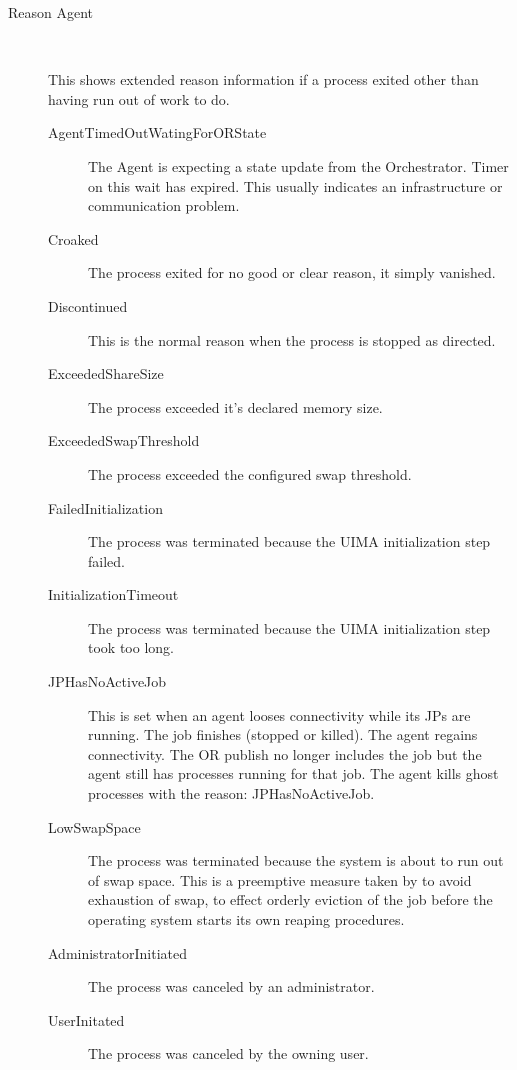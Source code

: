 \begin{description}
          \item[Reason Agent] \hfill \\
          \label{itm:job-details-agent}

          This shows extended reason information if a process exited other than having run out
          of work to do.

            \begin{description}
              \item[AgentTimedOutWatingForORState] The {\DUCC} Agent is expecting a state update
                from the {\DUCC} Orchestrator.  Timer on this wait has expired.  This usually 
                indicates an infrastructure or communication problem.
              \item[Croaked] The process exited for no good or clear reason, it simply vanished.
              \item[Discontinued] This is the normal reason when the process is stopped as directed.
              \item[ExceededShareSize] The process exceeded it's declared memory size.
              \item[ExceededSwapThreshold] The process exceeded the configured swap threshold.
              \item[FailedInitialization] The process was terminated because the UIMA 
                initialization step failed.
              \item[InitializationTimeout] The process was terminated because the UIMA initialization
                step took too long.
              \item[JPHasNoActiveJob] This is set when an agent looses connectivity while its
                JPs are running. The job finishes (stopped or killed). The agent regains
                connectivity. The OR publish no longer includes the job but the agent still has
                processes running for that job. The agent kills ghost processes with the reason:
                JPHasNoActiveJob.
              \item[LowSwapSpace] The process was terminated because the system is about to run
                out of swap space.  This is a preemptive measure taken by {\DUCC} to avoid exhaustion
                of swap, to effect orderly eviction of the job before the operating system starts
                its own reaping procedures.
              \item[AdministratorInitiated] The process was canceled by an administrator.
              \item[UserInitated] The process was canceled by the owning user.
            \end{description}
                    

\end{description}
